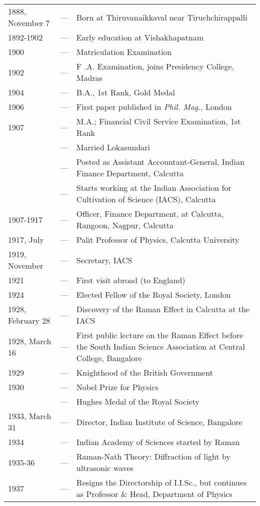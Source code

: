 \begin{longtable}{@{}lcp{6cm}<{\raggedright}@{}}
1888, November 7 & --- &  Born at Thiruvanaikkaval near
 Tiruchchirappalli\\
1892-1902 & --- & Early education at Vishakhapatnam\\
1900 & --- & Matriculation Examination\\
1902 & --- & F .A. Examination, joins Presidency
 College, Madras\\
1904 & --- & B.A., 1st Rank, Gold Medal\\
1906 & --- & First paper published in {\em Phil. Mag.}, London\\
1907 & --- & M.A.; Financial Civil Service Examination, 1st Rank\\
& --- &  Married Lokasundari\\
& --- & Posted as Assistant Accountant-General,
Indian Finance Department, Calcutta\\
& --- & Starts working at the Indian Association
for Cultivation of Science (IACS), Calcutta\\
1907-1917 & --- & Officer, Finance Department, at
Calcutta, Rangoon, Nagpur, Calcutta\\
1917, July & --- & Palit Professor of Physics, Calcutta
University\\
1919, November & --- & Secretary, IACS\\
1921 & --- & First visit abroad (to England)\\
1924 & --- & Elected Fellow of the Royal Society, London\\
1928, February 28 & --- & Discovery of the Raman Effect in
Calcutta at the IACS\\
1928, March 16 & --- & First public lecture on the Raman Effect
before the South Indian Science Association at Central College, Bangalore\\
1929 & --- & Knighthood of the British Government\\
1930 & --- & Nobel Prize for Physics\\
& --- & Hughes Medal of the Royal Society\\
1933, March 31 & --- & Director, Indian Institute of Science, Bangalore\\
1934 & --- & Indian Academy of Sciences started by Raman\\
1935-36 & --- & Raman-Nath Theory: Diffraction of light by ultrasonic waves\\
1937 & --- & Resigns the Directorship of I.I.Sc., but continues as Professor \& Head, Department of Physics\\

\end{longtable}
